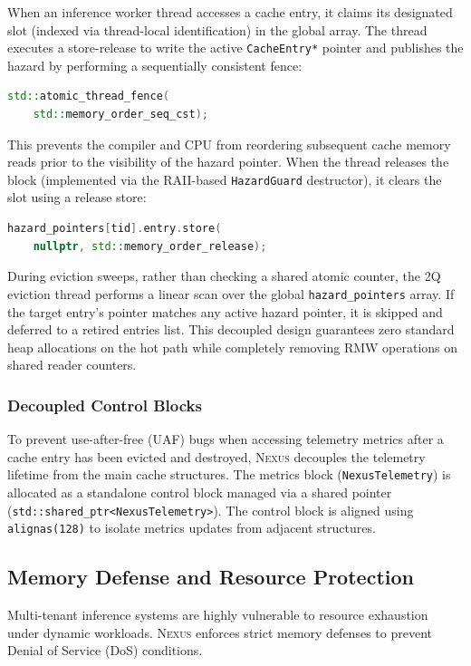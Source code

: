 \documentclass[conference,10pt]{IEEEtran}
\newcommand{\Nexus}{\textsc{Nexus}\xspace}
\begin{document}
When an inference worker thread accesses a cache entry, it claims its designated slot (indexed via thread-local identification) in the global array. The thread executes a store-release to write the active \texttt{CacheEntry*} pointer and publishes the hazard by performing a sequentially consistent fence:
\begin{lstlisting}[language=C++, basicstyle=\ttfamily\footnotesize, breaklines=true]
std::atomic_thread_fence(
    std::memory_order_seq_cst);
\end{lstlisting}
This prevents the compiler and CPU from reordering subsequent cache memory reads prior to the visibility of the hazard pointer. When the thread releases the block (implemented via the RAII-based \texttt{HazardGuard} destructor), it clears the slot using a release store:
\begin{lstlisting}[language=C++, basicstyle=\ttfamily\footnotesize, breaklines=true]
hazard_pointers[tid].entry.store(
    nullptr, std::memory_order_release);
\end{lstlisting}

During eviction sweeps, rather than checking a shared atomic counter, the 2Q eviction thread performs a linear scan over the global \texttt{hazard\_pointers} array. If the target entry's pointer matches any active hazard pointer, it is skipped and deferred to a retired entries list. This decoupled design guarantees zero standard heap allocations on the hot path while completely removing RMW operations on shared reader counters.

\subsubsection{Decoupled Control Blocks}
To prevent use-after-free (UAF) bugs when accessing telemetry metrics after a cache entry has been evicted and destroyed, \Nexus decouples the telemetry lifetime from the main cache structures. The metrics block (\texttt{NexusTelemetry}) is allocated as a standalone control block managed via a shared pointer (\texttt{std::shared\_ptr\textless{}NexusTelemetry\textgreater{}}). The control block is aligned using \texttt{alignas(128)} to isolate metrics updates from adjacent structures.

\subsection{Memory Defense and Resource Protection}
\label{subsec:sys-memory}

Multi-tenant inference systems are highly vulnerable to resource exhaustion under dynamic workloads. \Nexus enforces strict memory defenses to prevent Denial of Service (DoS) conditions.
\end{document}
